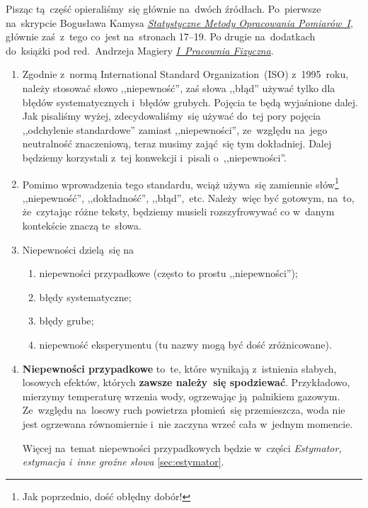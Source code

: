 \documentclass[a4paper,11pt]{article}
\newcommand{\tb}{\textbf}
\begin{document}
Pisząc tą~część opieraliśmy~się głównie na~dwóch źródłach. Po~pierwsze
na~skrypcie Bogusława Kamysa
\href{http://users.uj.edu.pl/\~ufkamys/BK/smop1N\_h.pdf}{\emph{Statystyczne
    Metody Opracowania Pomiarów~I}}, głównie zaś~z~tego co~jest
na~stronach 17--19. Po drugie na~dodatkach do~książki pod
red.~Andrzeja Magiery
\href{http://www.1pf.if.uj.edu.pl/documents/5046939/5227638/skrypt.pdf}{\emph{I~Pracownia
    Fizyczna}}.

\begin{enumerate}
\item Zgodnie z~normą International Standard Organization~(ISO)
  z~1995~roku, należy stosować słowo ,,niepewność'', zaś słowa
  ,,błąd'' używać tylko dla błędów systematycznych i~błędów grubych.
  Pojęcia te będą wyjaśnione dalej. Jak pisaliśmy wyżej,
  zdecydowaliśmy~się używać do~tej pory pojęcia ,,odchylenie
  standardowe'' zamiast ,,niepewności'', ze~względu na~jego
  neutralność znaczeniową, teraz musimy zająć~się tym dokładniej.
  Dalej będziemy korzystali z~tej konwekcji i~pisali
  o~,,niepewności''.

\item Pomimo wprowadzenia tego standardu, wciąż używa~się zamiennie
  słów\footnote{Jak poprzednio, dość obłędny dobór!} ,,niepewność'',
  ,,dokładność'', ,,błąd'',~etc. Należy~więc być gotowym, na~to,
  że~czytając różne teksty, będziemy musieli rozszyfrowywać co w~danym
  kontekście znaczą te~słowa.

\item Niepewności dzielą~się na
  \begin{enumerate}
  \item niepewności przypadkowe (często to prostu ,,niepewności'');
  \item błędy systematyczne;
  \item błędy grube;
  \item niepewność eksperymentu (tu nazwy mogą być dość zróżnicowane).
  \end{enumerate}

\item \textbf{Niepewności przypadkowe} to~te, które wynikają
  z~istnienia słabych, losowych efektów, których \tb{zawsze należy~się
    spodziewać}. Przykładowo, mierzymy temperaturę wrzenia wody,
  ogrzewając ją~palnikiem gazowym. Ze~względu na~losowy ruch powietrza
  płomień~się przemieszcza, woda nie jest ogrzewana równomiernie i~nie
  zaczyna wrzeć cała w~jednym momencie.

  Więcej na~temat niepewności przypadkowych będzie w~części
  \emph{Estymator, estymacja i~inne groźne słowa}
  \eqref{sec:estymator}.


\end{enumerate}
\end{document}
